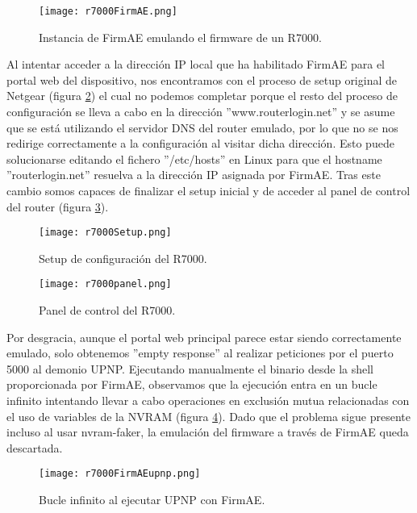 \begin{figure}[H]
    \centering
    \texttt{[image: r7000FirmAE.png]}
    \caption{Instancia de FirmAE emulando el firmware de un R7000.}
    \label{fig:R7000FirmAE}
\end{figure}

Al intentar acceder a la dirección IP local que ha habilitado FirmAE para el portal web del dispositivo, nos encontramos con el proceso de 
setup original de Netgear (figura \ref{fig:R7000Setup}) el cual no podemos completar porque el resto del proceso de configuración se lleva a cabo
en la dirección ''www.routerlogin.net'' y se asume que se está utilizando el servidor DNS del router emulado, por lo que no se nos redirige 
correctamente a la configuración al visitar dicha dirección. Esto puede solucionarse editando el fichero ''/etc/hosts'' en Linux para que 
el hostname ''routerlogin.net'' resuelva a la dirección IP asignada por FirmAE. Tras este cambio somos capaces de finalizar el setup inicial 
y de acceder al panel de control del router (figura \ref{fig:R7000panel}). 

\begin{figure}[H]
    \centering
    \texttt{[image: r7000Setup.png]}
    \caption{Setup de configuración del R7000.}
    \label{fig:R7000Setup}
\end{figure}

\begin{figure}[H]
    \centering
    \texttt{[image: r7000panel.png]}
    \caption{Panel de control del R7000.}
    \label{fig:R7000panel}
\end{figure}

Por desgracia, aunque el portal web principal parece estar siendo correctamente emulado, solo obtenemos ''empty response'' al realizar peticiones
por el puerto 5000 al demonio UPNP. Ejecutando manualmente el binario desde la shell proporcionada por FirmAE, observamos que la ejecución 
entra en un bucle infinito intentando llevar a cabo operaciones en exclusión mutua relacionadas con el uso de variables de la NVRAM 
(figura \ref{fig:R7000FirmAEupnp}). Dado que el problema sigue presente incluso al usar nvram-faker\cite{nvram}, la emulación del firmware
a través de FirmAE queda descartada.

\begin{figure}[H]
    \centering
    \texttt{[image: r7000FirmAEupnp.png]}
    \caption{Bucle infinito al ejecutar UPNP con FirmAE.}
    \label{fig:R7000FirmAEupnp}
\end{figure}

